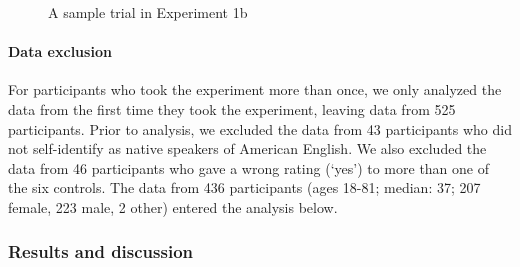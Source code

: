 \documentclass[11pt,fleqn]{article}
\newcommand{\6}{\mbox{$[\hspace*{-.6mm}[$}}
\newcommand{\9}{\mbox{$]\hspace*{-.6mm}]$}}
\begin{document}
\begin{figure}[h!]
\begin{center}
\end{center}
\caption{A sample trial in Experiment 1b}\label{fig-trial-exp1b}
\end{figure}

\paragraph{Data exclusion} For participants who took the experiment more than once, we only analyzed the data from the first time they took the experiment, leaving data from 525 participants. Prior to analysis, we excluded the data from 43 participants who did not self-identify as native speakers of American English. We also excluded the data from 46 participants who gave a wrong rating (`yes') to more than one of the six controls. The data from 436 participants (ages 18-81; median: 37; 207 female, 223 male, 2 other) entered the analysis below. 

\subsubsection{Results and discussion}
\end{document}
